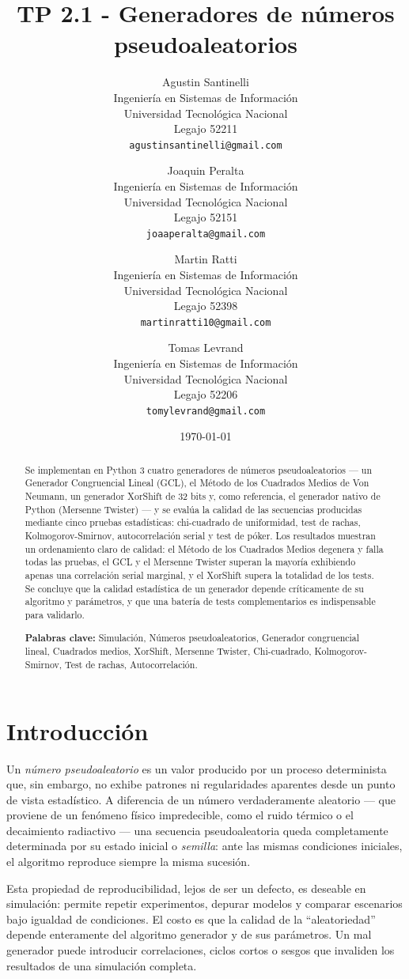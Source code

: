 \documentclass[11pt]{article}
\title{\textbf{TP 2.1 - Generadores de n\'umeros pseudoaleatorios}}
\author{
  Agustin Santinelli \\
  Ingenier\'ia en Sistemas de Informaci\'on \\
  Universidad Tecnol\'ogica Nacional \\
  Legajo 52211 \\
  \texttt{agustinsantinelli@gmail.com}
  \and
  Joaquin Peralta \\
  Ingenier\'ia en Sistemas de Informaci\'on \\
  Universidad Tecnol\'ogica Nacional \\
  Legajo 52151 \\
  \texttt{joaaperalta@gmail.com}
  \and
  Martin Ratti \\
  Ingenier\'ia en Sistemas de Informaci\'on \\
  Universidad Tecnol\'ogica Nacional \\
  Legajo 52398 \\
  \texttt{martinratti10@gmail.com}
  \and
  Tomas Levrand \\
  Ingenier\'ia en Sistemas de Informaci\'on \\
  Universidad Tecnol\'ogica Nacional \\
  Legajo 52206 \\
  \texttt{tomylevrand@gmail.com}
}
\date{\today}
\begin{document}
\maketitle

\begin{abstract}
\noindent Se implementan en Python 3 cuatro generadores de n\'umeros
pseudoaleatorios --- un Generador Congruencial Lineal (GCL), el M\'etodo
de los Cuadrados Medios de Von Neumann, un generador XorShift de 32 bits
y, como referencia, el generador nativo de Python (Mersenne Twister) ---
y se eval\'ua la calidad de las secuencias producidas mediante cinco
pruebas estad\'isticas: chi-cuadrado de uniformidad, test de rachas,
Kolmogorov-Smirnov, autocorrelaci\'on serial y test de p\'oker. Los
resultados muestran un ordenamiento claro de calidad: el M\'etodo de los
Cuadrados Medios degenera y falla todas las pruebas, el GCL y el Mersenne
Twister superan la mayor\'ia exhibiendo apenas una correlaci\'on serial
marginal, y el XorShift supera la totalidad de los tests. Se concluye que
la calidad estad\'istica de un generador depende cr\'iticamente de su
algoritmo y par\'ametros, y que una bater\'ia de tests complementarios es
indispensable para validarlo.

\vspace{0.5em}
\noindent\textbf{Palabras clave:} Simulaci\'on, N\'umeros pseudoaleatorios,
Generador congruencial lineal, Cuadrados medios, XorShift, Mersenne
Twister, Chi-cuadrado, Kolmogorov-Smirnov, Test de rachas, Autocorrelaci\'on.
\end{abstract}

\section{Introducci\'on}

Un \emph{n\'umero pseudoaleatorio} es un valor producido por un proceso
determinista que, sin embargo, no exhibe patrones ni regularidades
aparentes desde un punto de vista estad\'istico. A diferencia de un
n\'umero verdaderamente aleatorio --- que proviene de un fen\'omeno
f\'isico impredecible, como el ruido t\'ermico o el decaimiento
radiactivo --- una secuencia pseudoaleatoria queda completamente
determinada por su estado inicial o \emph{semilla}: ante las mismas
condiciones iniciales, el algoritmo reproduce siempre la misma sucesi\'on.

Esta propiedad de reproducibilidad, lejos de ser un defecto, es deseable
en simulaci\'on: permite repetir experimentos, depurar modelos y comparar
escenarios bajo igualdad de condiciones. El costo es que la calidad de la
``aleatoriedad'' depende enteramente del algoritmo generador y de sus
par\'ametros. Un mal generador puede introducir correlaciones, ciclos
cortos o sesgos que invaliden los resultados de una simulaci\'on completa.
\end{document}

